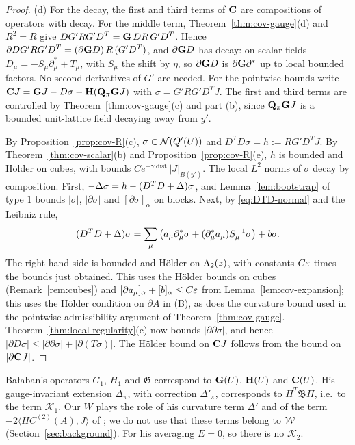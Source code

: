 \begin{proof}
(d) For the decay, the first and third terms of $\mathbf C$ are compositions of operators with decay. For the middle term, Theorem~\ref{thm:cov-gauge}(d) and $R^2=R$ give $DG'RG'D^T=\mathbf G\,DR\,G'D^T$. Hence $\partial DG'RG'D^T=(\partial\mathbf G D)\,R\,(G'D^T)$, and $\partial\mathbf G D$ has decay: on scalar fields $D_\mu=-S_\mu\partial^*_\mu+T_\mu$, with $S_\mu$ the shift by $\eta$, so $\partial\mathbf G D$ is $\partial\mathbf G\partial^*$ up to local bounded factors. No second derivatives of $G'$ are needed. For the pointwise bounds write $\mathbf C J=\mathbf G J-D\sigma-\mathbf H(\mathbf Q_\pi\mathbf G J)$ with $\sigma=G'RG'D^TJ$. The first and third terms are controlled by Theorem~\ref{thm:cov-gauge}(c) and part (b), since $\mathbf Q_\pi\mathbf G J$ is a bounded unit-lattice field decaying away from $y'$.

By Proposition~\ref{prop:cov-R}(c), $\sigma\in\mathcal N(Q'(U))$ and $D^TD\sigma=h:=RG'D^TJ$. By Theorem~\ref{thm:cov-scalar}(b) and Proposition~\ref{prop:cov-R}(e), $h$ is bounded and H\"older on cubes, with bounds $Ce^{-\gamma\operatorname{dist}}|J|_{B(y')}$. The local $L^2$ norms of $\sigma$ decay by composition. First, $-\Delta\sigma=h-(D^TD+\Delta)\sigma$, and Lemma~\ref{lem:bootstrap} of type $1$ bounds $|\sigma|$, $|\partial\sigma|$ and $[\partial\sigma]_\alpha$ on blocks. Next, by \eqref{eq:DTD-normal} and the Leibniz rule,
\[
(D^TD+\Delta)\sigma=\sum_\mu\big(a_\mu\partial^*_\mu\sigma+(\partial^*_\mu a_\mu)S_\mu^{-1}\sigma\big)+b\sigma .
\]
The right-hand side is bounded and H\"older on $\Lambda_2(z)$, with constants $C\varepsilon$ times the bounds just obtained. This uses the H\"older bounds on cubes (Remark~\ref{rem:cubes}) and $[\partial a_\mu]_\alpha+[b]_\alpha\le C\varepsilon$ from Lemma~\ref{lem:cov-expansion}; this uses the H\"older condition on $\partial A$ in (B), as does the curvature bound used in the pointwise admissibility argument of Theorem~\ref{thm:cov-gauge}. Theorem~\ref{thm:local-regularity}(c) now bounds $|\partial\partial\sigma|$, and hence $|\partial D\sigma|\le|\partial\partial\sigma|+|\partial(T\sigma)|$. The H\"older bound on $\mathbf C J$ follows from the bound on $|\partial\mathbf C J|$.
\end{proof}

\begin{remark}
Ba\l aban's operators $G_1$, $H_1$ and $\mathfrak G$ \cite[(3.128), (3.129), (3.153)]{BalBackground} correspond to $\mathbf G(U)$, $\mathbf H(U)$ and $\mathbf C(U)$. His gauge-invariant extension $\Delta_\pi$, with correction $\Delta'_\pi$, corresponds to $\Pi^T\mathfrak B\Pi$, i.e.\ to the term $\mathcal K_1$. Our $W$ plays the role of his curvature term $\Delta'$ \cite[(3.10)]{BalBackground} and of the term $-2\langle HC^{(2)}(A),J\rangle$ of \cite[(3.128)]{BalBackground}; we do not use that these terms belong to $\mathcal W$ (Section~\ref{sec:background}). For his averaging $E=0$, so there is no $\mathcal K_2$.
\end{remark}

